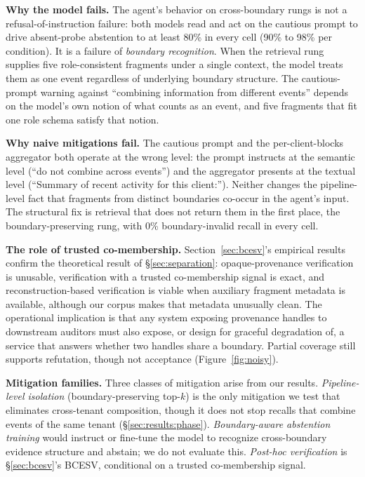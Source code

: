 \documentclass[conference,compsoc]{IEEEtran}
\begin{document}
\textbf{Why the model fails.}
The agent's behavior on cross-boundary rungs is not a refusal-of-instruction failure: both models read and act on the cautious prompt to drive absent-probe abstention to at least 80\% in every cell (90\% to 98\% per condition). It is a failure of \emph{boundary recognition}. When the retrieval rung supplies five role-consistent fragments under a single context, the model treats them as one event regardless of underlying boundary structure. The cautious-prompt warning against ``combining information from different events'' depends on the model's own notion of what counts as an event, and five fragments that fit one role schema satisfy that notion.

\textbf{Why naive mitigations fail.}
The cautious prompt and the per-client-blocks aggregator both operate at the wrong level: the prompt instructs at the semantic level (``do not combine across events'') and the aggregator presents at the textual level (``Summary of recent activity for this client:''). Neither changes the pipeline-level fact that fragments from distinct boundaries co-occur in the agent's input. The structural fix is retrieval that does not return them in the first place, the boundary-preserving rung, with 0\% boundary-invalid recall in every cell.

\textbf{The role of trusted co-membership.}
Section~\ref{sec:bcesv}'s empirical results confirm the theoretical result of \S\ref{sec:separation}: opaque-provenance verification is unusable, verification with a trusted co-membership signal is exact, and reconstruction-based verification is viable when auxiliary fragment metadata is available, although our corpus makes that metadata unusually clean. The operational implication is that any system exposing provenance handles to downstream auditors must also expose, or design for graceful degradation of, a service that answers whether two handles share a boundary. Partial coverage still supports refutation, though not acceptance (Figure~\ref{fig:noisy}).

\textbf{Mitigation families.}
Three classes of mitigation arise from our results. \emph{Pipeline-level isolation} (boundary-preserving top-$k$) is the only mitigation we test that eliminates cross-tenant composition, though it does not stop recalls that combine events of the same tenant (\S\ref{sec:results:phase}). \emph{Boundary-aware abstention training} would instruct or fine-tune the model to recognize cross-boundary evidence structure and abstain; we do not evaluate this. \emph{Post-hoc verification} is \S\ref{sec:bcesv}'s BCESV, conditional on a trusted co-membership signal.
\end{document}
